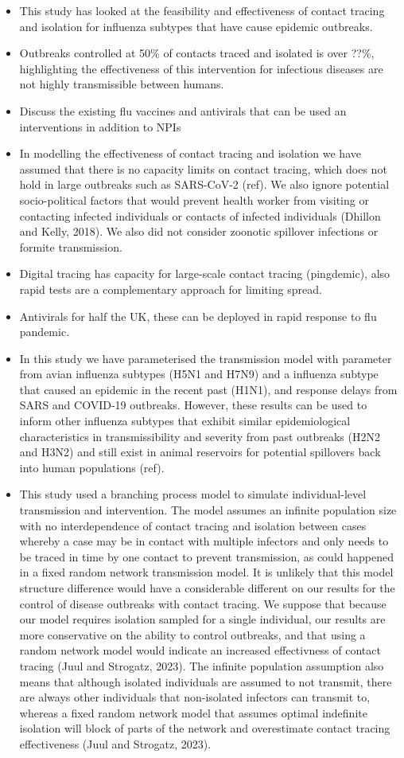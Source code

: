 \documentclass{article}
\begin{document}
\begin{itemize}
\item This study has looked at the feasibility and effectiveness of contact tracing and isolation for influenza subtypes that have cause epidemic outbreaks.
\item Outbreaks controlled at 50\% of contacts traced and isolated is over ??\%, highlighting the effectiveness of this intervention for infectious diseases are not highly transmissible between humans.
\item Discuss the existing flu vaccines and antivirals that can be used an interventions in addition to NPIs
\item In modelling the effectiveness of contact tracing and isolation we have assumed that there is no capacity limits on contact tracing, which does not hold in large outbreaks such as SARS-CoV-2 (ref). We also ignore potential socio-political factors that would prevent health worker from visiting or contacting infected individuals or contacts of infected individuals (Dhillon and Kelly, 2018). We also did not consider zoonotic spillover infections or formite transmission.
\item Digital tracing has capacity for large-scale contact tracing (pingdemic), also rapid tests are a complementary approach for limiting spread.
\item Antivirals for half the UK, these can be deployed in rapid response to flu pandemic.
\item In this study we have parameterised the transmission model with parameter from avian influenza subtypes (H5N1 and H7N9) and a influenza subtype that caused an epidemic in the recent past (H1N1), and response delays from SARS and COVID-19 outbreaks. However, these results can be used to inform other influenza subtypes that exhibit similar epidemiological characteristics in transmissibility and severity from past outbreaks (H2N2 and H3N2) and still exist in animal reservoirs for potential spillovers back into human populations (ref).
\item This study used a branching process model to simulate individual-level transmission and intervention. The model assumes an infinite population size with no interdependence of contact tracing and isolation between cases whereby a case may be in contact with multiple infectors and only needs to be traced in time by one contact to prevent transmission, as could happened in a fixed random network transmission model. It is unlikely that this model structure difference would have a considerable different on our results for the control of disease outbreaks with contact tracing. We suppose that because our model requires isolation sampled for a single individual, our results are more conservative on the ability to control outbreaks, and that using a random network model would indicate an increased effectivness of contact tracing (Juul and Strogatz, 2023). The infinite population assumption also means that although isolated individuals are assumed to not transmit, there are always other individuals that non-isolated infectors can transmit to, whereas a fixed random network model that assumes optimal indefinite isolation will block of parts of the network and overestimate contact tracing effectiveness (Juul and Strogatz, 2023).

\end{itemize}
\end{document}
